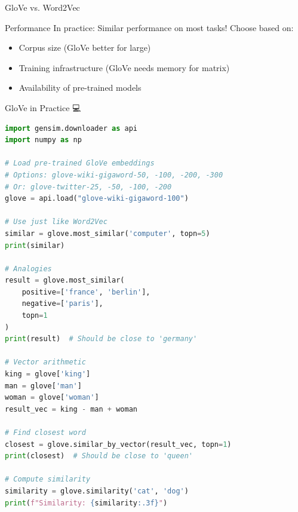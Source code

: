 \documentclass[aspectratio=169]{beamer}
\begin{document}
\begin{frame}[shrink=10]{GloVe vs. Word2Vec 🥊}
\vspace{1em}

\begin{block}{Performance}
In practice: Similar performance on most tasks! Choose based on:
\begin{itemize}\setlength{\itemsep}{0pt}
    \item Corpus size (GloVe better for large)
    \item Training infrastructure (GloVe needs memory for matrix)
    \item Availability of pre-trained models
\end{itemize}
\end{block}
\end{frame}

\begin{frame}[fragile]{GloVe in Practice 💻}
\begin{lstlisting}[language=Python]
import gensim.downloader as api
import numpy as np

# Load pre-trained GloVe embeddings
# Options: glove-wiki-gigaword-50, -100, -200, -300
# Or: glove-twitter-25, -50, -100, -200
glove = api.load("glove-wiki-gigaword-100")

# Use just like Word2Vec
similar = glove.most_similar('computer', topn=5)
print(similar)

# Analogies
result = glove.most_similar(
    positive=['france', 'berlin'],
    negative=['paris'],
    topn=1
)
print(result)  # Should be close to 'germany'

# Vector arithmetic
king = glove['king']
man = glove['man']
woman = glove['woman']
result_vec = king - man + woman

# Find closest word
closest = glove.similar_by_vector(result_vec, topn=1)
print(closest)  # Should be close to 'queen'

# Compute similarity
similarity = glove.similarity('cat', 'dog')
print(f"Similarity: {similarity:.3f}")
\end{lstlisting}
\end{frame}
\end{document}
